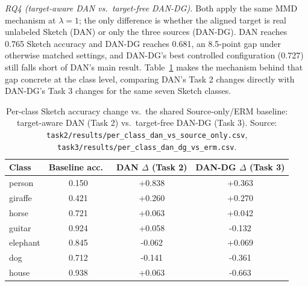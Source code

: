 \documentclass{article}
\begin{document}
\emph{RQ4 (target-aware DAN vs.\ target-free DAN-DG).} Both apply the same MMD mechanism at
$\lambda=1$; the only difference is whether the aligned target is real unlabeled Sketch (DAN) or
only the three sources (DAN-DG). DAN reaches 0.765 Sketch accuracy and DAN-DG reaches 0.681, an
8.5-point gap under otherwise matched settings, and DAN-DG's best controlled configuration (0.727)
still falls short of DAN's main result. Table~\ref{tab:task2-vs-task3-perclass} makes the mechanism
behind that gap concrete at the class level, comparing DAN's Task 2 changes directly with DAN-DG's
Task 3 changes for the same seven Sketch classes.

\begin{table}[h]
  \centering
  \caption{Per-class Sketch accuracy change vs.\ the shared Source-only/ERM baseline: target-aware DAN (Task 2) vs.\ target-free DAN-DG (Task 3). Source: \texttt{task2/results/per\_class\_dan\_vs\_source\_only.csv}, \texttt{task3/results/per\_class\_dan\_dg\_vs\_erm.csv}.}
  \label{tab:task2-vs-task3-perclass}
  \small
  \begin{tabular}{lccc}
    \toprule
    Class & Baseline acc.\ & DAN $\Delta$ (Task 2) & DAN-DG $\Delta$ (Task 3) \\
    \midrule
    person   & 0.150 & +0.838 & +0.363 \\
    giraffe  & 0.421 & +0.260 & +0.270 \\
    horse    & 0.721 & +0.063 & +0.042 \\
    guitar   & 0.924 & +0.058 & -0.132 \\
    elephant & 0.845 & -0.062 & +0.069 \\
    dog      & 0.712 & -0.141 & -0.361 \\
    house    & 0.938 & +0.063 & -0.663 \\
    \bottomrule
  \end{tabular}
\end{table}
\end{document}
